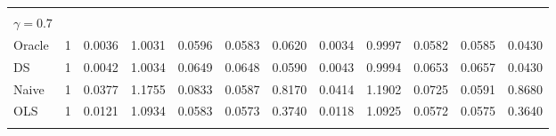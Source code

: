 \begin{tabular}{llllllllllll}
\multicolumn{1}{l}{} &
  \multicolumn{1}{|r}{} &
  \multicolumn{1}{r}{} &
  \multicolumn{1}{r}{} &
  \multicolumn{1}{r}{} &
  \multicolumn{1}{r}{} &
  \multicolumn{1}{r}{} &
  \multicolumn{1}{r}{} &
  \multicolumn{1}{r}{} &
  \multicolumn{1}{r}{} &
  \multicolumn{1}{r}{} &
  \multicolumn{1}{r}{} \\
\multicolumn{1}{l}{$\gamma = 0.7$} &
  \multicolumn{1}{|r}{} &
  \multicolumn{1}{r}{} &
  \multicolumn{1}{r}{} &
  \multicolumn{1}{r}{} &
  \multicolumn{1}{r}{} &
  \multicolumn{1}{r}{} &
  \multicolumn{1}{r}{} &
  \multicolumn{1}{r}{} &
  \multicolumn{1}{r}{} &
  \multicolumn{1}{r}{} &
  \multicolumn{1}{r}{} \\
\multicolumn{1}{l}{\hspace{1em}Oracle} &
  \multicolumn{1}{|r}{1} &
  \multicolumn{1}{r}{0.0036} &
  \multicolumn{1}{r}{1.0031} &
  \multicolumn{1}{r}{0.0596} &
  \multicolumn{1}{r}{0.0583} &
  \multicolumn{1}{r}{0.0620} &
  \multicolumn{1}{r}{0.0034} &
  \multicolumn{1}{r}{0.9997} &
  \multicolumn{1}{r}{0.0582} &
  \multicolumn{1}{r}{0.0585} &
  \multicolumn{1}{r}{0.0430} \\
\multicolumn{1}{l}{\hspace{1em}DS} &
  \multicolumn{1}{|r}{1} &
  \multicolumn{1}{r}{0.0042} &
  \multicolumn{1}{r}{1.0034} &
  \multicolumn{1}{r}{0.0649} &
  \multicolumn{1}{r}{0.0648} &
  \multicolumn{1}{r}{0.0590} &
  \multicolumn{1}{r}{0.0043} &
  \multicolumn{1}{r}{0.9994} &
  \multicolumn{1}{r}{0.0653} &
  \multicolumn{1}{r}{0.0657} &
  \multicolumn{1}{r}{0.0430} \\
\multicolumn{1}{l}{\hspace{1em}Naive} &
  \multicolumn{1}{|r}{1} &
  \multicolumn{1}{r}{0.0377} &
  \multicolumn{1}{r}{1.1755} &
  \multicolumn{1}{r}{0.0833} &
  \multicolumn{1}{r}{0.0587} &
  \multicolumn{1}{r}{0.8170} &
  \multicolumn{1}{r}{0.0414} &
  \multicolumn{1}{r}{1.1902} &
  \multicolumn{1}{r}{0.0725} &
  \multicolumn{1}{r}{0.0591} &
  \multicolumn{1}{r}{0.8680} \\
\multicolumn{1}{l}{\hspace{1em}OLS} &
  \multicolumn{1}{|r}{1} &
  \multicolumn{1}{r}{0.0121} &
  \multicolumn{1}{r}{1.0934} &
  \multicolumn{1}{r}{0.0583} &
  \multicolumn{1}{r}{0.0573} &
  \multicolumn{1}{r}{0.3740} &
  \multicolumn{1}{r}{0.0118} &
  \multicolumn{1}{r}{1.0925} &
  \multicolumn{1}{r}{0.0572} &
  \multicolumn{1}{r}{0.0575} &
  \multicolumn{1}{r}{0.3640} \\
\multicolumn{1}{l}{} &
  \multicolumn{1}{|r}{} &
  \multicolumn{1}{r}{} &
  \multicolumn{1}{r}{} &

\end{tabular}
